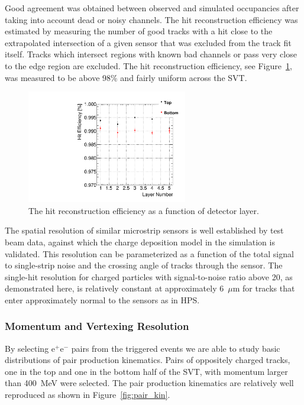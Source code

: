 \documentclass[final,3p,times,twocolumn]{elsarticle}
\newcommand{\ee}{e$^+$e$^-$}
\begin{document}
Good agreement was obtained between observed and simulated occupancies after taking into account dead or 
noisy channels. The hit reconstruction efficiency was estimated by measuring 
the number of good tracks with a hit close to the extrapolated intersection of a given sensor that was 
excluded from the track fit itself. Tracks which intersect regions with known bad channels or pass very 
close to the edge region are excluded. The hit reconstruction efficiency, see Figure~\ref{fig:hit_efficiency}, 
was measured to be above 98\% and fairly uniform across the SVT.
\begin{figure}[]
\begin{center}
{\small
    	\includegraphics[width=7cm]{figures/single_hit_efficiency_Omar_11192013.pdf}
        \caption{ The hit reconstruction efficiency as a function of detector layer.}
	\label{fig:hit_efficiency}
}
\end{center}
\end{figure}


The spatial resolution of similar microstrip sensors is well established by test beam data, against which 
the charge deposition model in the simulation is validated.  This resolution can be parameterized as a 
function of the total signal to single-strip noise and the crossing angle of tracks through the sensor.  
The single-hit resolution for charged particles with signal-to-noise ratio above 20, as demonstrated 
here, is relatively constant at approximately 6~$\mu$m for tracks that enter approximately normal to 
the sensors as in HPS.



\subsubsection{Momentum and Vertexing Resolution}

By selecting \ee{} pairs from the triggered events we are able to study basic distributions of pair 
production kinematics. Pairs of oppositely charged tracks, one in the top and one in the bottom half of 
the SVT, with momentum larger than 400~MeV were selected. The pair production kinematics are 
relatively well reproduced as shown in Figure~\ref{fig:pair_kin}. 
\end{document}
